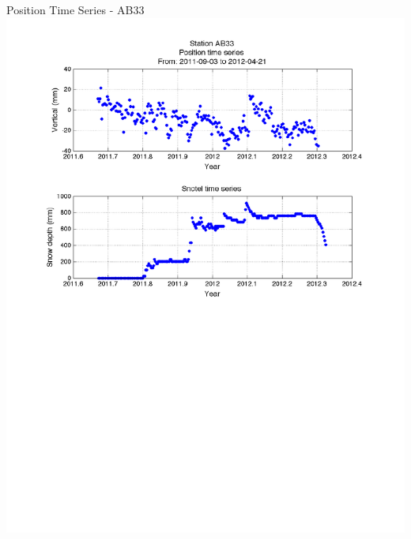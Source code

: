 \documentclass{beamer}
\begin{document}
\begin{frame}{Position Time Series - AB33}
  \includegraphics[width=1\linewidth,trim=50 0 50 20, clip=true]{logan/ab33_snotel.pdf}
\end{frame}
\end{document}
